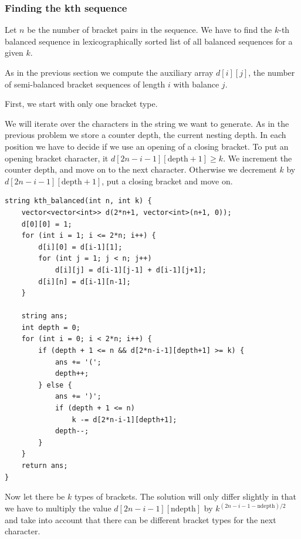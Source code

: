\documentclass[8pt, a4paper, oneside, twocolumn]{extarticle}
\begin{document}
\subsubsection{Finding the kth sequence}
Let $n$ be the number of bracket pairs in the sequence. We have to find the $k$-th balanced sequence in lexicographically sorted list of all balanced sequences for a given $k$.

As in the previous section we compute the auxiliary array $d[i][j]$, the number of semi-balanced bracket sequences of length $i$ with balance $j$.

First, we start with only one bracket type.

We will iterate over the characters in the string we want to generate. As in the previous problem we store a counter $\text{depth}$, the current nesting depth. In each position we have to decide if we use an opening of a closing bracket. To put an opening bracket character, it $d[2n - i - 1][\text{depth}+1] \ge k$. We increment the counter $\text{depth}$, and move on to the next character. Otherwise we decrement $k$ by $d[2n - i - 1][\text{depth}+1]$, put a closing bracket and move on.
\begin{verbatim}
string kth_balanced(int n, int k) {
    vector<vector<int>> d(2*n+1, vector<int>(n+1, 0));
    d[0][0] = 1;
    for (int i = 1; i <= 2*n; i++) {
        d[i][0] = d[i-1][1];
        for (int j = 1; j < n; j++)
            d[i][j] = d[i-1][j-1] + d[i-1][j+1];
        d[i][n] = d[i-1][n-1];
    }

    string ans;
    int depth = 0;
    for (int i = 0; i < 2*n; i++) {
        if (depth + 1 <= n && d[2*n-i-1][depth+1] >= k) {
            ans += '(';
            depth++;
        } else {
            ans += ')';
            if (depth + 1 <= n)
                k -= d[2*n-i-1][depth+1];
            depth--;
        }
    }
    return ans;
}
\end{verbatim}
Now let there be $k$ types of brackets. The solution will only differ slightly in that we have to multiply the value $d[2n-i-1][\text{ndepth}]$ by $k^{(2n-i-1-\text{ndepth})/2}$ and take into account that there can be different bracket types for the next character.
\end{document}
